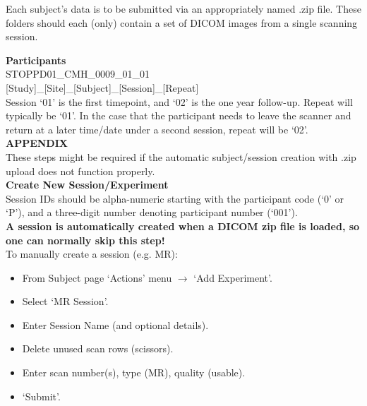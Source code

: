 \documentclass[a4paper,11pt,oneside]{book}
\newcommand\headingshack{
\noindent
\large
\leftskip=0in
\textbf
}
\newcommand\titlesL{%
    \noindent
    \small
    \leftskip=0in
    \textbf
}
\newcommand\stepsL{
    \noindent
    \leftskip=0.15in
    \small
}
\newcommand\namingL{
    \small
    \noindent
    \leftskip=0in
    \textbf
}
\newcommand\namingexampleL{
    \noindent
    \leftskip=0.15in
    \small
}
\begin{document}
\begin{multicols}{2}
{\stepsL{Each subject's data is to be submitted via an appropriately named .zip file. These folders should each (only) contain a set of DICOM images from a single scanning session.} \\

%
\columnbreak
%

\namingL{Participants} \\
\namingexampleL{STOPPD01\_CMH\_0009\_01\_01}\\
\namingexampleL{[Study]\_[Site]\_[Subject]\_[Session]\_[Repeat]}\\

\stepsL{Session `01' is the first timepoint, and `02' is the one year follow-up. Repeat will typically be `01'. In the case that the participant needs to leave the scanner and return at a later time/date under a second session, repeat will be `02'.}\\

\headingshack{APPENDIX}\\

\stepsL{These steps might be required if the automatic subject/session creation with .zip upload does not function properly.} \\


\titlesL{Create New Session/Experiment} \\

\stepsL{Session IDs should be alpha-numeric starting with the participant code (`0' or `P'), and a three-digit number denoting participant number (`001').} \\

\stepsL{\textbf{A session is automatically created when a DICOM zip file is loaded, so one can normally skip this step!}} \\

\stepsL{To manually create a session (e.g. MR):}

\stepsL{\begin{itemize}
            \item{From Subject page `Actions' menu $\rightarrow$ `Add Experiment'.}
            \item{Select `MR Session'.}
            \item{Enter Session Name (and optional details).}
            \item{Delete unused scan rows (scissors).}
            \item{Enter scan number(s), type (MR), quality (usable).}
            \item{`Submit'.}
            \end{itemize}
        } \


}
\end{multicols}
\end{document}
